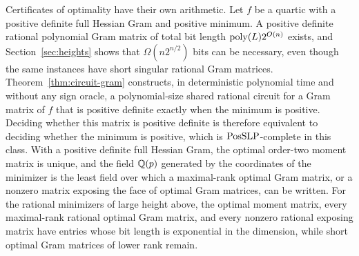 Certificates of optimality have their own arithmetic. Let $f$ be a quartic
with a positive definite full Hessian Gram and positive minimum. A positive
definite rational polynomial Gram matrix of total bit length
$\operatorname{poly}(L)2^{O(n)}$ exists, and Section~\ref{sec:heights} shows that
$\Omega(n2^{n/2})$ bits can be necessary, even though the same instances have
short singular rational Gram matrices. Theorem~\ref{thm:circuit-gram}
constructs, in deterministic polynomial time and without any sign oracle, a
polynomial-size shared rational circuit for a Gram matrix of $f$ that is
positive definite exactly when the minimum is positive. Deciding whether this
matrix is positive definite is therefore equivalent to deciding whether the
minimum is positive, which is $\mathrm{PosSLP}$-complete in this class. With a
positive definite full Hessian Gram, the optimal order-two moment matrix is
unique, and the field $\mathbb Q(p)$ generated by the coordinates of the minimizer is
the least field over which a maximal-rank optimal Gram matrix, or a nonzero
matrix exposing the face of optimal Gram matrices, can be written. For the
rational minimizers of large height above, the optimal moment matrix, every
maximal-rank rational optimal Gram matrix, and every nonzero rational exposing
matrix have entries whose bit length is exponential in the dimension, while
short optimal Gram matrices of lower rank remain.

